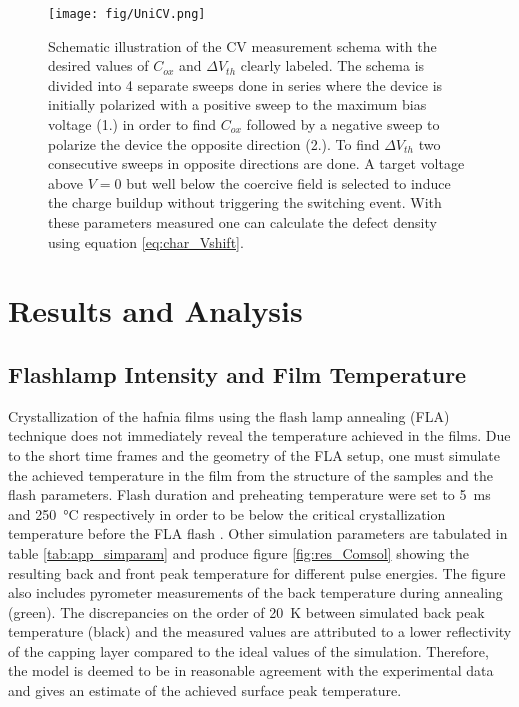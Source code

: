 \documentclass[11pt,twoside]{eitExjobb}
\begin{document}
\begin{figure}[htbp]
    \centering
    \texttt{[image: fig/UniCV.png]}
    \caption{Schematic illustration of the CV measurement schema with the
    desired values of $C_{ox}$ and $\Delta V_{th}$ clearly labeled. The schema
    is divided into 4 separate sweeps done in series where the device is initially
    polarized with a positive sweep to the maximum bias voltage (1.) in order to
    find $C_{ox}$ followed by a negative sweep to polarize the device the opposite
    direction (2.). To find $\Delta V_{th}$ two consecutive sweeps in opposite
    directions are done. A target voltage above $V=0$ but well below the coercive
    field is selected to induce the charge buildup without triggering the switching
    event. With these parameters measured one can calculate the defect density
    using equation \ref{eq:char_Vshift}.}
    \label{fig:char_CV}
\end{figure}

\chapter{Results and Analysis}\label{ch:res}

\section{Flashlamp Intensity and Film Temperature}
Crystallization of the hafnia films using the flash lamp annealing (FLA)
technique does not immediately reveal the temperature achieved in the films. Due
to the short time frames and the geometry of the FLA setup, one must simulate
the achieved temperature in the film from the structure of the samples and the
flash parameters. Flash duration and preheating temperature were set to
\SI{5}{\milli\second} and \SI{250}{\celsius} respectively in order to be below
the critical crystallization temperature before the FLA
flash \cite{migita2019phase}. Other simulation parameters are tabulated in
table \ref{tab:app_simparam} and produce figure \ref{fig:res_Comsol} showing the
resulting back and front peak temperature for different pulse energies. The figure also
includes pyrometer measurements of the back temperature during annealing
(green). The discrepancies on the order of \SI{20}{\kelvin} between simulated
back peak temperature (black) and the measured values are attributed to a 
lower reflectivity of the  capping layer compared to the ideal values of
the simulation. Therefore, the model is deemed to be in reasonable agreement
with the experimental data and gives an estimate of the achieved surface peak temperature.
\end{document}
